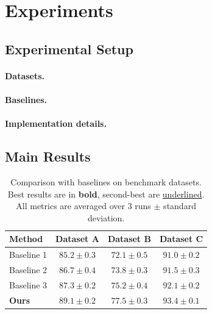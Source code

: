 \documentclass[10pt]{article} %
\theoremstyle{definition}
\theoremstyle{remark}
\begin{document}
\section{Experiments}
\label{sec:experiments}

\subsection{Experimental Setup}
\label{sec:setup}

\paragraph{Datasets.}

\paragraph{Baselines.}

\paragraph{Implementation details.}

\subsection{Main Results}
\label{sec:results}

\begin{table}[t]
\caption{Comparison with baselines on benchmark datasets. Best results are in \textbf{bold}, second-best are \underline{underlined}. All metrics are averaged over 3 runs $\pm$ standard deviation.}
\label{tab:main_results}
\begin{center}
\begin{tabular}{lccc}
\toprule
\textbf{Method} & \textbf{Dataset A} & \textbf{Dataset B} & \textbf{Dataset C} \\
\midrule
Baseline 1      & $85.2 \pm 0.3$     & $72.1 \pm 0.5$     & $91.0 \pm 0.2$     \\
Baseline 2      & $86.7 \pm 0.4$     & $73.8 \pm 0.3$     & $91.5 \pm 0.3$     \\
Baseline 3      & \underline{$87.3 \pm 0.2$}     & \underline{$75.2 \pm 0.4$}     & \underline{$92.1 \pm 0.2$}     \\
\midrule
\textbf{Ours}   & $\mathbf{89.1 \pm 0.2}$ & $\mathbf{77.5 \pm 0.3}$ & $\mathbf{93.4 \pm 0.1}$ \\
\bottomrule
\end{tabular}
\end{center}
\end{table}
\end{document}
